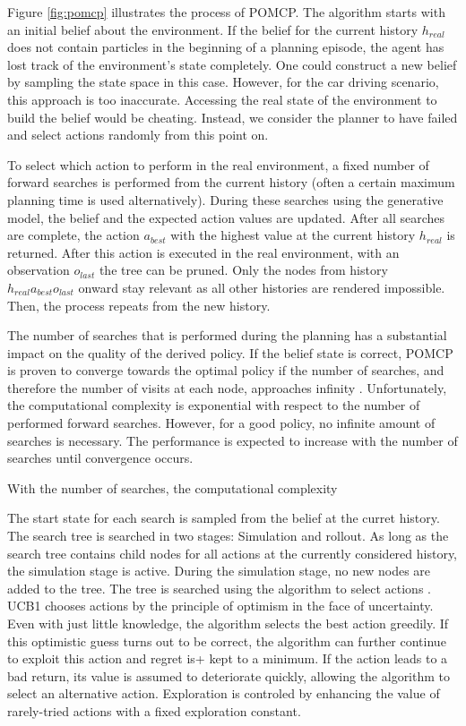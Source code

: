 Figure \ref{fig:pomcp} illustrates the process of POMCP. The algorithm starts with an initial belief about the environment. If the belief for the current history $h_{real}$ does not contain particles in the beginning of a planning episode, the agent has lost track of the environment's state completely. One could construct a new belief by sampling the state space in this case. However, for the car driving scenario, this approach is too inaccurate. Accessing the real state of the environment to build the belief would be cheating. Instead, we consider the planner to have failed and select actions randomly from this point on.

To select which action to perform in the real environment, a fixed number of forward searches is performed from the current history (often a certain maximum planning time is used alternatively). During these searches using the generative model, the belief and the expected action values are updated. After all searches are complete, the action $a_{best}$ with the highest value at the current history $h_{real}$ is returned. After this action is executed in the real environment, with an observation $o_{last}$ the tree can be pruned. Only the nodes from history $h_{real}a_{best}o_{last}$ onward stay relevant as all other histories are rendered impossible. Then, the process repeats from the new history.

The number of searches that is performed during the planning has a substantial impact on the quality of the derived policy. If the belief state is correct, POMCP is proven to converge towards the optimal policy if the number of searches, and therefore the number of visits at each node, approaches infinity \parencite{pomcp}. Unfortunately, the computational complexity is exponential with respect to the number of performed forward searches. However, for a good policy, no infinite amount of searches is necessary. The performance is expected to increase with the number of searches until convergence occurs. 

With the number of searches, the computational complexity 

The start state for each search is sampled from the belief at the curret history. The search tree is searched in two stages: Simulation and rollout. As long as the search tree contains child nodes for all actions at the currently considered history, the simulation stage is active. During the simulation stage, no new nodes are added to the tree. The tree is searched using the  algorithm to select actions \parencite{ucb1}. UCB1 chooses actions by the principle of optimism in the face of uncertainty. Even with just little knowledge, the algorithm selects the best action greedily. If this optimistic guess turns out to be correct, the algorithm can further continue to exploit this action and regret is+ kept to a minimum. If the action leads to a bad return, its value is assumed to deteriorate quickly, allowing the algorithm to select an alternative action. Exploration is controled by enhancing the value of rarely-tried actions with a fixed exploration constant. 

